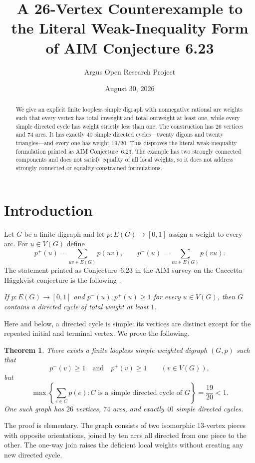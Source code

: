 \documentclass[10pt,reqno]{amsart}
\title[A counterexample to AIM Conjecture 6.23]
{A 26-Vertex Counterexample to the Literal Weak-Inequality Form of AIM Conjecture 6.23}
\author{Argus Open Research Project}
\date{August 30, 2026}
\newcommand{\inwt}{p^{-}}
\newcommand{\outwt}{p^{+}}
\newtheorem{theorem}{Theorem}[section]
\theoremstyle{definition}
\begin{document}
\begin{abstract}
We give an explicit finite loopless simple digraph with nonnegative rational arc weights such that every vertex has total inweight and total outweight at least one, while every simple directed cycle has weight strictly less than one. The construction has $26$ vertices and $74$ arcs. It has exactly $40$ simple directed cycles---twenty digons and twenty triangles---and every one has weight $19/20$. This disproves the literal weak-inequality formulation printed as AIM Conjecture~6.23. The example has two strongly connected components and does not satisfy equality of all local weights, so it does not address strongly connected or equality-constrained formulations.
\end{abstract}

\maketitle

\section{Introduction}

Let $G$ be a finite digraph and let $p:E(G)\to[0,1]$ assign a weight to every arc. For $u\in V(G)$ define
\[
  \outwt(u)=\sum_{uv\in E(G)}p(uv),
  \qquad
  \inwt(u)=\sum_{vu\in E(G)}p(vu).
\]
The statement printed as Conjecture~6.23 in the AIM survey on the Caccetta--H\"aggkvist conjecture is the following \cite[p.~9]{Sullivan2006}.

\medskip
\noindent
\emph{If $p:E(G)\to[0,1]$ and $\inwt(u),\outwt(u)\geq1$ for every $u\in V(G)$, then $G$ contains a directed cycle of total weight at least $1$.}
\medskip

Here and below, a directed cycle is simple: its vertices are distinct except for the repeated initial and terminal vertex. We prove the following.

\begin{theorem}\label{thm:main}
There exists a finite loopless simple weighted digraph $(G,p)$ such that
\[
  \inwt(v)\geq1\quad\text{and}\quad\outwt(v)\geq1
  \qquad (v\in V(G)),
\]
but
\[
  \max\left\{\sum_{e\in C}p(e): C\text{ is a simple directed cycle of }G\right\}
  =\frac{19}{20}<1.
\]
One such graph has $26$ vertices, $74$ arcs, and exactly $40$ simple directed cycles.
\end{theorem}

The proof is elementary. The graph consists of two isomorphic $13$-vertex pieces with opposite orientations, joined by ten arcs all directed from one piece to the other. The one-way join raises the deficient local weights without creating any new directed cycle.
\end{document}
